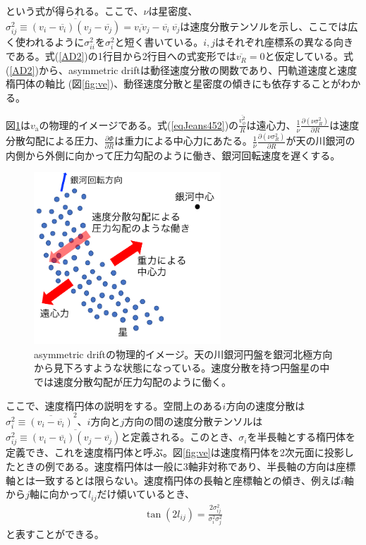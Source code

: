という式が得られる。ここで、$\nu$は星密度、$\sigma_{ij}^2 \equiv \overline{(v_i-\overline{v_i})(v_j-\overline{v_j})}=\overline{v_i v_j}-\overline{v_i}\ \overline{v_j}$は速度分散テンソルを示し、ここでは広く使われるように$\sigma_{ii}^2$を$\sigma_i^2$と短く書いている。$i,j$はそれぞれ座標系の異なる向きである。式(\ref{AD2})の1行目から2行目への式変形では$\overline{v_R}=0$と仮定している。式(\ref{AD2})から、asymmetric driftは動径速度分散の関数であり、円軌道速度と速度楕円体の軸比 (図\ref{fig:ve})、動径速度分散と星密度の傾きにも依存することがわかる。

図\ref{AD_image}は$v_{\mathrm{a}}$の物理的イメージである。式(\ref{eqJeans452})の$\frac{\overline{v_{\phi}^2}}{R}$は遠心力、$\frac{1}{\nu}\frac{\partial(\nu\sigma_R^2)}{\partial R}$は速度分散勾配による圧力、$\frac{\partial \Phi}{\partial R}$は重力による中心力にあたる。$\frac{1}{\nu}\frac{\partial(\nu\sigma_R^2)}{\partial R}$が天の川銀河の内側から外側に向かって圧力勾配のように働き、銀河回転速度を遅くする。
\begin{figure}[htbp]
\begin{center}
	\includegraphics[width=7cm]{fig/AD_image.pdf}
	\caption{asymmetric driftの物理的イメージ。天の川銀河円盤を銀河北極方向から見下ろすような状態になっている。速度分散を持つ円盤星の中では速度分散勾配が圧力勾配のように働く。}
	\label{AD_image}
\end{center}
\end{figure}

ここで、速度楕円体の説明をする。空間上のある$i$方向の速度分散は$\sigma_i^2 \equiv \overline{(v_i-\overline{v_i})}^2$、$i$方向と$j$方向の間の速度分散テンソルは$\sigma_{ij}^2 \equiv \overline{(v_i-\overline{v_i})(v_j-\overline{v_j})}$と定義される。このとき、$\sigma_i$を半長軸とする楕円体を定義でき、これを速度楕円体と呼ぶ。図\ref{fig:ve}は速度楕円体を2次元面に投影したときの例である。速度楕円体は一般に3軸非対称であり、半長軸の方向は座標軸とは一致するとは限らない。速度楕円体の長軸と座標軸との傾き、例えば$i$軸から$j$軸に向かって$l_{ij}$だけ傾いているとき、
\begin{align}
    \tan(2l_{ij}) = \frac{2\sigma _{ij}^2}{\sigma_i^2 \sigma_j^2}
\end{align}
と表すことができる。

